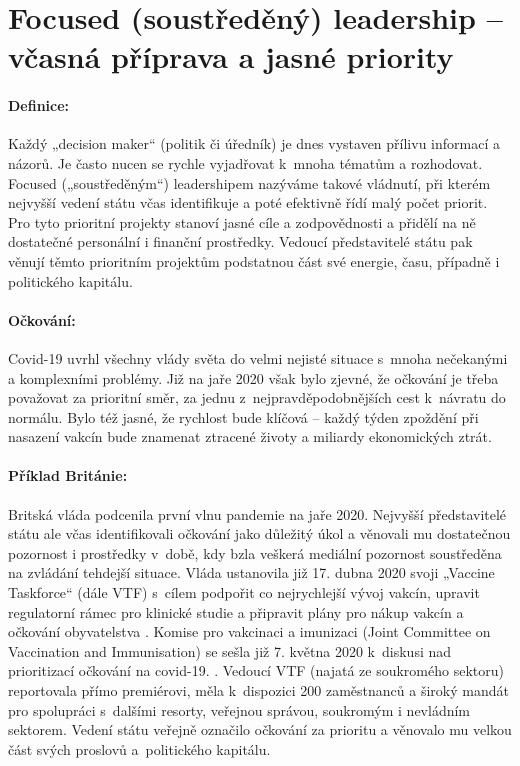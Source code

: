 \section*{Focused (soustředěný) leadership -- včasná příprava a jasné priority}

\paragraph {Definice:} Každý „decision maker“ (politik či úředník) je dnes vystaven přílivu informací a názorů. Je často nucen se rychle vyjadřovat k~mnoha tématům a rozhodovat. Focused („soustředěným“) leadershipem nazýváme takové vládnutí, při kterém nejvyšší vedení státu včas identifikuje a poté efektivně řídí malý počet priorit. Pro tyto prioritní projekty stanoví jasné cíle a zodpovědnosti a přidělí na ně dostatečné personální i finanční prostředky. Vedoucí představitelé státu pak věnují těmto prioritním projektům podstatnou část své energie, času, případně i politického kapitálu.

\paragraph{Očkování:} Covid-19 uvrhl všechny vlády světa do velmi nejisté situace s~mnoha nečekanými a komplexními problémy. Již na jaře 2020 však bylo zjevné, že očkování je třeba považovat za prioritní směr, za jednu z~nejpravděpodobnějších cest k~návratu do normálu. Bylo též jasné, že rychlost bude klíčová -- každý týden zpoždění při nasazení vakcín bude znamenat ztracené životy a miliardy ekonomických ztrát.

\paragraph{Příklad Británie:} Britská vláda podcenila první vlnu pandemie na jaře 2020. Nejvyšší představitelé státu ale včas identifikovali očkování jako důležitý úkol a věnovali mu dostatečnou pozornost i prostředky v~době, kdy bzla veškerá mediální pozornost soustředěna na zvládání tehdejší situace. Vláda ustanovila již 17. dubna 2020 svoji „Vaccine Taskforce“ (dále VTF) s~cílem podpořit co nejrychlejší vývoj vakcín, upravit regulatorní rámec pro klinické studie a připravit plány pro nákup vakcín a očkování obyvatelstva \cite{department_for_business_energy__industrial_strategy_government_2020}. Komise pro vakcinaci a imunizaci (Joint Committee on Vaccination and Immunisation) se sešla již 7. května 2020 k~diskusi nad prioritizací očkování na covid-19. \cite{department_of_health_and_social_care_joint_2020}. Vedoucí VTF (najatá ze soukromého sektoru) reportovala přímo premiérovi, měla k~dispozici 200 zaměstnanců a široký mandát pro spolupráci s~dalšími resorty, veřejnou správou, soukromým i nevládním sektorem. Vedení státu veřejně označilo očkování za prioritu a věnovalo mu velkou část svých proslovů a~politického kapitálu.

